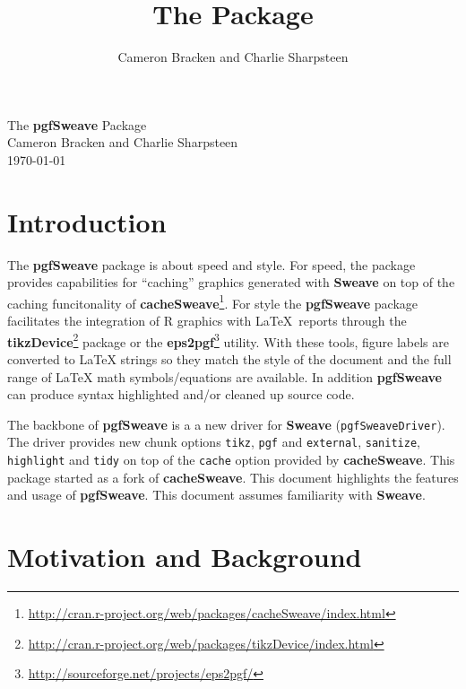 \documentclass{article}
\title{The \pkg{pgfSweave} Package}
\author{Cameron Bracken and Charlie Sharpsteen}
\newcommand{\lang}{\textsf}
\newcommand{\code}{\texttt}
\newcommand{\pkg}{\textbf}
\begin{document}


\begin{center}
{\Large The \pkg{pgfSweave} Package}\\
{\large Cameron Bracken and Charlie Sharpsteen \\ \today}\vspace{1cm}
\end{center}

\tableofcontents

\clearpage
\section{Introduction} 
The \pkg{pgfSweave} package is about {\color{SteelBlue1}speed} and {\color{Sienna1}style}.  For {\color{SteelBlue1}speed}, the package provides capabilities for ``caching'' graphics generated with \pkg{Sweave} on top of the caching funcitonality of \pkg{cacheSweave}\footnote{\url{http://cran.r-project.org/web/packages/cacheSweave/index.html}}.  For {\color{Sienna1}style} the \pkg{pgfSweave} package facilitates the integration of \lang{R} graphics with \LaTeX\ reports through the \pkg{tikzDevice}\footnote{\url{http://cran.r-project.org/web/packages/tikzDevice/index.html}} package or the \pkg{eps2pgf}\footnote{\url{http://sourceforge.net/projects/eps2pgf/}} utility.  With these tools, figure labels are converted to \LaTeX{} strings so they match the style of the document and the full range of \LaTeX{} math symbols/equations are available.  In addition \pkg{pgfSweave} can produce syntax highlighted and/or cleaned up source code. 

The backbone of \pkg{pgfSweave} is a a new driver for \pkg{Sweave} (\code
{pgfSweaveDriver}). The driver provides new chunk options \code{tikz}, \code{pgf} and \code
{external}, \code{sanitize}, \code{highlight} and \code{tidy} on top of the \code{cache} option provided by \pkg{cacheSweave}.  This package 
started as a fork of \pkg{cacheSweave}. This document highlights the features and usage of 
\pkg{pgfSweave}.  This document assumes familiarity with \pkg{Sweave}.  

\section{Motivation and Background} 
\end{document}
